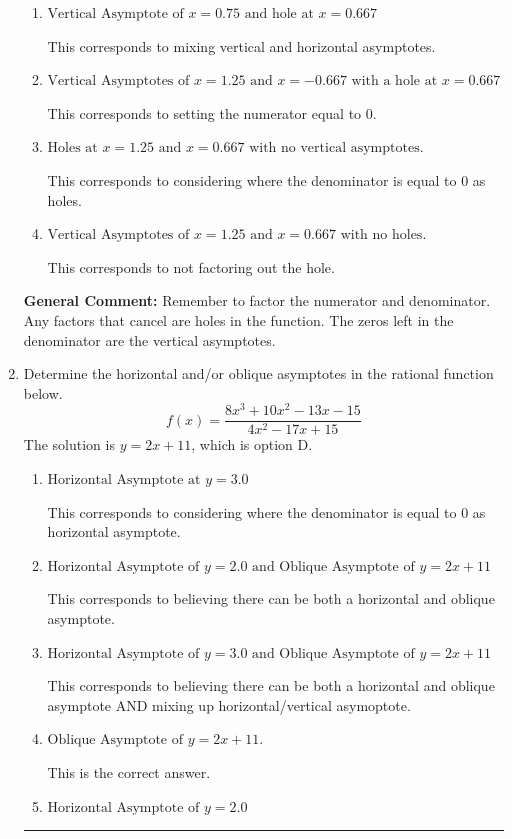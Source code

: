 \documentclass{extbook}[14pt]
\newcommand{\litem}[1]{\item #1

\rule{\textwidth}{0.4pt}}
\begin{document}
\begin{enumerate}
{\begin{enumerate}[label=\Alph*.]
This is the correct answer.
\item \( \text{Vertical Asymptote of } x = 0.75 \text{ and hole at } x = 0.667 \)

This corresponds to mixing vertical and horizontal asymptotes.
\item \( \text{Vertical Asymptotes of } x = 1.25 \text{ and } x = -0.667 \text{ with a hole at } x = 0.667 \)

This corresponds to setting the numerator equal to 0.
\item \( \text{Holes at } x = 1.25 \text{ and } x = 0.667 \text{ with no vertical asymptotes.} \)

This corresponds to considering where the denominator is equal to 0 as holes.
\item \( \text{Vertical Asymptotes of } x = 1.25 \text{ and } x = 0.667 \text{ with no holes.} \)

This corresponds to not factoring out the hole.
\end{enumerate}

\textbf{General Comment:} Remember to factor the numerator and denominator. Any factors that cancel are holes in the function. The zeros left in the denominator are the vertical asymptotes.
}
\litem{
Determine the horizontal and/or oblique asymptotes in the rational function below.
\[ f(x) = \frac{8x^{3} +10 x^{2} -13 x -15}{4x^{2} -17 x + 15} \]The solution is \( y = 2x + 11 \), which is option D.\begin{enumerate}[label=\Alph*.]
\item \( \text{Horizontal Asymptote at } y = 3.0 \)

This corresponds to considering where the denominator is equal to 0 as horizontal asymptote.
\item \( \text{Horizontal Asymptote of } y = 2.0 \text{ and Oblique Asymptote of } y = 2x + 11 \)

This corresponds to believing there can be both a horizontal and oblique asymptote.
\item \( \text{Horizontal Asymptote of } y = 3.0 \text{ and Oblique Asymptote of } y = 2x + 11 \)

This corresponds to believing there can be both a horizontal and oblique asymptote AND mixing up horizontal/vertical asymoptote.
\item \( \text{Oblique Asymptote of } y = 2x + 11. \)

This is the correct answer.
\item \( \text{Horizontal Asymptote of } y = 2.0  \)


\end{enumerate}}
\end{enumerate}
\end{document}
